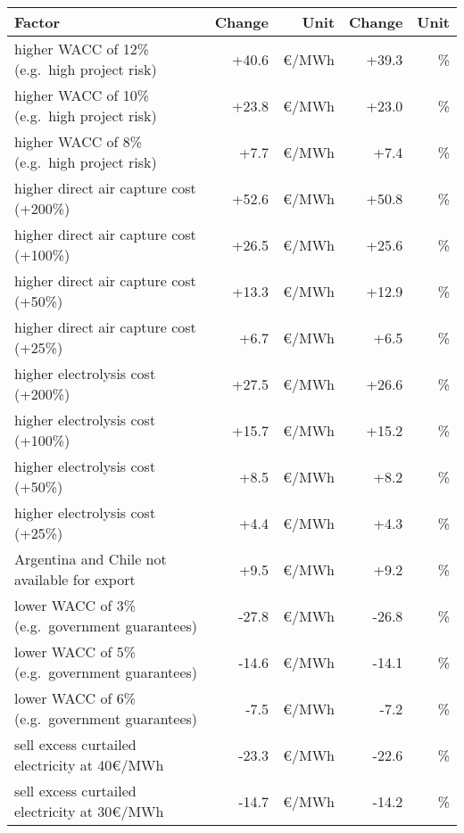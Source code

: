 \begin{table*}
    \small
    \centering
    \begin{tabular}{lrrrr}
        \toprule
        Factor & Change & Unit & Change & Unit\\
        \midrule
        higher WACC of 12\% (e.g.~high project risk) & +40.6 & \euro{}/MWh  & +39.3 & \% \\
        higher WACC of 10\% (e.g.~high project risk) & +23.8 & \euro{}/MWh  & +23.0 & \% \\
        higher WACC of 8\% (e.g.~high project risk) & +7.7 & \euro{}/MWh  & +7.4 & \% \\
        higher direct air capture cost (+200\%) & +52.6 & \euro{}/MWh  & +50.8 & \% \\
        higher direct air capture cost (+100\%) & +26.5 & \euro{}/MWh  & +25.6 & \% \\
        higher direct air capture cost (+50\%) & +13.3 & \euro{}/MWh  & +12.9 & \% \\
        higher direct air capture cost (+25\%) & +6.7 & \euro{}/MWh  & +6.5 & \% \\
        higher electrolysis cost (+200\%) & +27.5 & \euro{}/MWh  & +26.6 & \% \\
        higher electrolysis cost (+100\%) & +15.7 & \euro{}/MWh  & +15.2 & \% \\
        higher electrolysis cost (+50\%) & +8.5 & \euro{}/MWh  & +8.2 & \% \\
        higher electrolysis cost (+25\%) & +4.4 & \euro{}/MWh  & +4.3 & \% \\
        Argentina and Chile not available for export & +9.5 & \euro{}/MWh  & +9.2 & \% \\
        \midrule
        lower WACC of 3\% (e.g.~government guarantees) & -27.8 & \euro{}/MWh  & -26.8 & \% \\
        lower WACC of 5\% (e.g.~government guarantees) & -14.6 & \euro{}/MWh  & -14.1 & \% \\
        lower WACC of 6\% (e.g.~government guarantees) & -7.5 & \euro{}/MWh  & -7.2 & \% \\
        sell excess curtailed electricity at 40€/MWh & -23.3 & \euro{}/MWh  & -22.6 & \% \\
        sell excess curtailed electricity at 30€/MWh & -14.7 & \euro{}/MWh  & -14.2 & \% \\

\end{tabular}
\end{table*}
